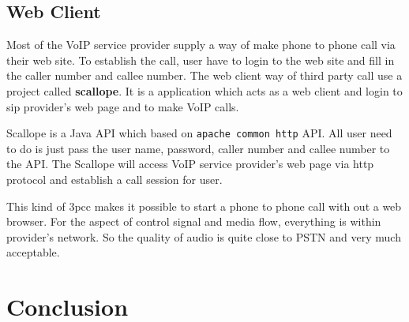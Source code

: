 \subsection{Web Client}
\label{sec:Solution:ThirdPartyCall:WebClient}

Most of the VoIP service provider supply a way of make phone to phone call via their web site. To establish the call, user have to login to the web site and fill in the caller number and callee number. The web client way of third party call use a project called \textbf{scallope}\cite{ScallopeAPI}. It is a application which acts as a web client and login to sip provider's web page and to make VoIP calls.

Scallope is a Java API which based on \texttt{apache common http} API. All user need to do is just pass the user name, password, caller number and callee number to the API. The Scallope will access VoIP service provider's web page via http protocol and establish a call session for user.

This kind of 3pcc makes it possible to start a phone to phone call with out a web browser. For the aspect of control signal and media flow, everything is within provider's network. So the quality of audio is quite close to PSTN and very much acceptable.

\section{Conclusion}
\label{sec:Solution:Conclusion}

